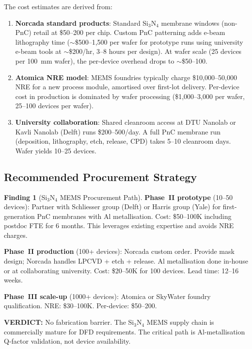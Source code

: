 \documentclass[11pt]{article}
\theoremstyle{definition}
\newtheorem{finding}[theorem]{Finding}
\theoremstyle{remark}
\newcommand{\verdict}[1]{\textcolor{green!50!black}{\textbf{VERDICT:} #1}}
\begin{document}
The cost estimates are derived from:
\begin{enumerate}[nosep]
\item \textbf{Norcada standard products}: Standard Si$_3$N$_4$
  membrane windows (non-PnC) retail at \$50--200 per chip. Custom
  PnC patterning adds e-beam lithography time ($\sim$\$500--1,500
  per wafer for prototype runs using university e-beam tools at
  $\sim$\$200/hr, 3--8 hours per design). At wafer scale
  (25 devices per 100~mm wafer), the per-device overhead drops
  to $\sim$\$50--100.

\item \textbf{Atomica NRE model}: MEMS foundries typically charge
  \$10,000--50,000 NRE for a new process module, amortised over
  first-lot delivery. Per-device cost in production is dominated
  by wafer processing (\$1,000--3,000 per wafer, 25--100 devices
  per wafer).

\item \textbf{University collaboration}: Shared cleanroom access at
  DTU Nanolab or Kavli Nanolab (Delft) runs \$200--500/day. A
  full PnC membrane run (deposition, lithography, etch, release,
  CPD) takes 5--10 cleanroom days. Wafer yields 10--25 devices.
\end{enumerate}

\subsection{Recommended Procurement Strategy}

\begin{finding}[Si$_3$N$_4$ MEMS Procurement Path]
\label{find:procurement}
\textbf{Phase~II prototype} (10--50 devices): Partner with
Schliesser group (Delft) or Harris group (Yale) for first-generation
PnC membranes with Al metallisation. Cost: \$50--100K including
postdoc FTE for 6 months. This leverages existing expertise and
avoids NRE charges.

\textbf{Phase~II production} (100+ devices): Norcada custom order.
Provide mask design; Norcada handles LPCVD + etch + release.
Al metallisation done in-house or at collaborating university.
Cost: \$20--50K for 100 devices. Lead time: 12--16 weeks.

\textbf{Phase~III scale-up} (1000+ devices): Atomica or SkyWater
foundry qualification. NRE: \$30--100K. Per-device: \$50--200.

\verdict{No fabrication barrier. The Si$_3$N$_4$ MEMS supply chain
is commercially mature for DFD requirements. The critical path is
Al-metallisation Q-factor validation, not device availability.}
\end{finding}
\end{document}
